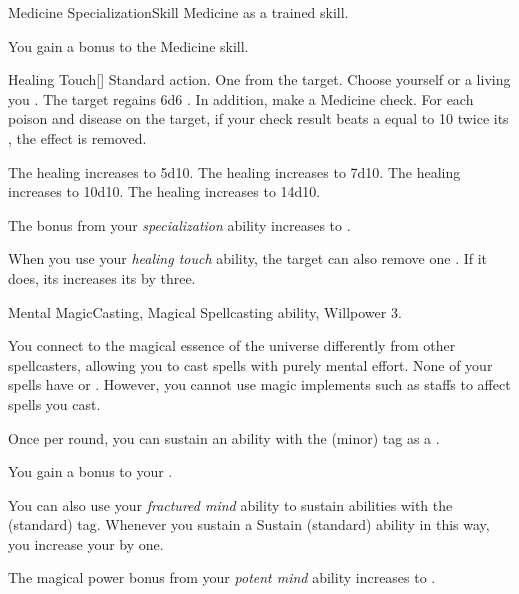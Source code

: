   \begin{feat}{Medicine Specialization}{Skill}
    \featpre Medicine as a trained skill.

     You gain a  bonus to the Medicine skill.

    \begin{activeability}{Healing Touch}[]
      \abilityusagetime Standard action.
      \abilitycost One  from the target.
      \rankline
      Choose yourself or a living  you .
      The target regains 6d6 .
      In addition, make a Medicine check.
      For each poison and disease on the target, if your check result beats a  equal to 10 \add twice its , the effect is removed.

      \rankline
       The healing increases to 5d10.
       The healing increases to 7d10.
       The healing increases to 10d10.
       The healing increases to 14d10.
    \end{activeability}

     The bonus from your \textit{specialization} ability increases to .

     When you use your \textit{healing touch} ability, the target can also remove one .
    If it does, its increases its  by three.
  \end{feat}

  \begin{magicalfeat}{Mental Magic}{Casting, Magical}
    \featpre Spellcasting ability, Willpower 3.

     You connect to the magical essence of the universe differently from other spellcasters, allowing you to cast spells with purely mental effort.
    None of your spells have  or .
    However, you cannot use magic implements such as staffs to affect spells you cast.

     Once per round, you can sustain an ability with the  (minor) tag as a .

     You gain a  bonus to your .

     You can also use your \textit{fractured mind} ability to sustain abilities with the  (standard) tag.
    Whenever you sustain a Sustain (standard) ability in this way, you increase your  by one.

     The magical power bonus from your \textit{potent mind} ability increases to .
  \end{magicalfeat}

